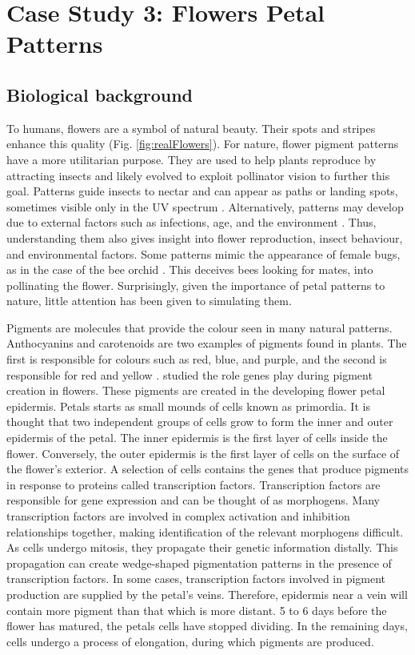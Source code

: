 \chapter{Case Study 3: Flowers Petal Patterns}

\section{Biological background}
To humans, flowers are a symbol of natural beauty. Their spots and stripes enhance this quality (Fig. \ref{fig:realFlowers}). For nature, flower pigment patterns have a more utilitarian purpose. They are used to help plants reproduce by attracting insects and likely evolved to exploit pollinator vision to further this goal. Patterns guide insects to nectar and can appear as paths or landing spots, sometimes visible only in the UV spectrum \citep{davies2012}. Alternatively, patterns may develop due to external factors such as infections, age, and the environment \citep{davies2012, robinson2015}. Thus, understanding them also gives insight into flower reproduction, insect behaviour, and environmental factors. Some patterns mimic the appearance of female bugs, as in the case of the bee orchid \citep{vereecken7484}. This deceives bees looking for mates, into pollinating the flower. Surprisingly, given the importance of petal patterns to nature, little attention has been given to simulating them.

Pigments are molecules that provide the colour seen in many natural patterns. Anthocyanins and carotenoids are two examples of pigments found in plants. The first is responsible for colours such as red, blue, and purple, and the second is responsible for red and yellow \citep{bayer1966}. \citet{martin1993} studied the role genes play during pigment creation in flowers. These pigments are created in the developing flower petal epidermis. Petals starts as small mounds of cells known as primordia. It is thought that two independent groups of cells grow to form the inner and outer epidermis of the petal. The inner epidermis is the first layer of cells inside the flower. Conversely, the outer epidermis is the first layer of cells on the surface of the flower's exterior. A selection of cells contains the genes that produce pigments in response to proteins called transcription factors. Transcription factors are responsible for gene expression and can be thought of as morphogens. Many transcription factors are involved in complex activation and inhibition relationships together, making identification of the relevant morphogens difficult. As cells undergo mitosis, they propagate their genetic information distally. This propagation can create wedge-shaped pigmentation patterns in the presence of transcription factors. In some cases, transcription factors involved in pigment production are supplied by the petal's veins. Therefore, epidermis near a vein will contain more pigment than that which is more distant. 5 to 6 days before the flower has matured, the petals cells have stopped dividing. In the remaining days, cells undergo a process of elongation, during which pigments are produced.

